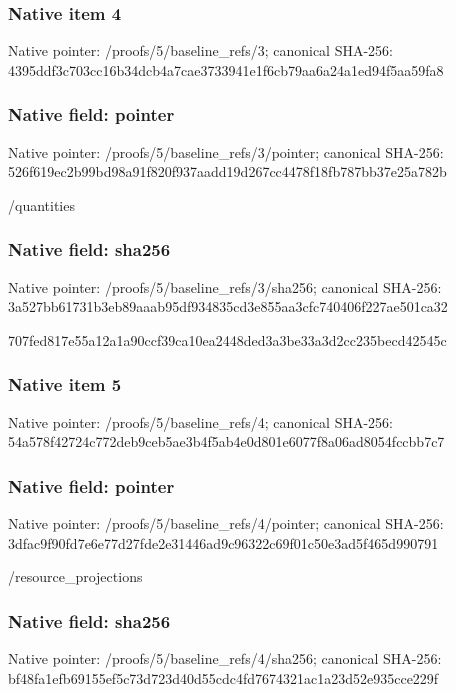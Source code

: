 \documentclass[10pt,a4paper]{article}
\begin{document}
\subsubsection{Native item 4}
Native pointer: /proofs/5/baseline\_\allowbreak{}refs/3; canonical SHA-256: 4395ddf3c703cc16b34dcb4a7cae3733941e1f6cb79aa6a24a1ed94f5aa59fa8

\subsubsection{Native field: pointer}
Native pointer: /proofs/5/baseline\_\allowbreak{}refs/3/pointer; canonical SHA-256: 526f619ec2b99bd98a91f820f937aadd19d267cc4478f18fb787bb37e25a782b

\begingroup\raggedright\sloppy /\allowbreak{}quantities\par\endgroup

\subsubsection{Native field: sha256}
Native pointer: /proofs/5/baseline\_\allowbreak{}refs/3/sha256; canonical SHA-256: 3a527bb61731b3eb89aaab95df934835cd3e855aa3cfc740406f227ae501ca32

\begingroup\raggedright\sloppy 707fed817e55a12a1a90ccf39ca10ea2448ded3a3be33a3d2cc235becd42545c\par\endgroup

\subsubsection{Native item 5}
Native pointer: /proofs/5/baseline\_\allowbreak{}refs/4; canonical SHA-256: 54a578f42724c772deb9ceb5ae3b4f5ab4e0d801e6077f8a06ad8054fccbb7c7

\subsubsection{Native field: pointer}
Native pointer: /proofs/5/baseline\_\allowbreak{}refs/4/pointer; canonical SHA-256: 3dfac9f90fd7e6e77d27fde2e31446ad9c96322c69f01c50e3ad5f465d990791

\begingroup\raggedright\sloppy /\allowbreak{}resource\_\allowbreak{}projections\par\endgroup

\subsubsection{Native field: sha256}
Native pointer: /proofs/5/baseline\_\allowbreak{}refs/4/sha256; canonical SHA-256: bf48fa1efb69155ef5c73d723d40d55cdc4fd7674321ac1a23d52e935cce229f
\end{document}
